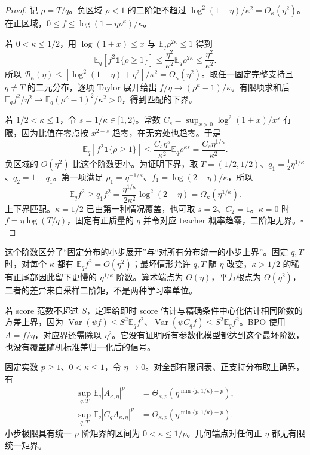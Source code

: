 \documentclass[lang=cn,scheme=chinese,openany]{../book/elegantbook}
\newcommand{\E}{\mathbb E}
\newcommand{\Var}{\operatorname{Var}}
\begin{document}
\begin{proof}
记 $\rho=T/q$。负区域 $\rho<1$ 的二阶矩不超过 $\log^2(1-\eta)/\kappa^2=O_\kappa(\eta^2)$。在正区域，$0\le f\le\log(1+\eta\rho^\kappa)/\kappa$。

若 $0<\kappa\le1/2$，用 $\log(1+x)\le x$ 与 $\E_q\rho^{2\kappa}\le1$ 得到
\begin{equation}
 \E_q[f^2\mathbf1\{\rho\ge1\}]
 \le\frac{\eta^2}{\kappa^2}\E_q\rho^{2\kappa}
 \le\frac{\eta^2}{\kappa^2}.
\end{equation}
所以 $\mathcal B_\kappa(\eta)\le[\log^2(1-\eta)+\eta^2]/\kappa^2=O_\kappa(\eta^2)$。取任一固定完整支持且 $q\ne T$ 的二元分布，逐项 Taylor 展开给出 $f/\eta\to(\rho^\kappa-1)/\kappa$。有限项求和后 $\E_qf^2/\eta^2\to\E_q(\rho^\kappa-1)^2/\kappa^2>0$，得到匹配的下界。

若 $1/2<\kappa\le1$，令 $s=1/\kappa\in[1,2)$。常数 $C_s=\sup_{x>0}\log^2(1+x)/x^s$ 有限，因为比值在零点按 $x^{2-s}$ 趋零，在无穷处也趋零。于是
\begin{equation}
 \E_q[f^2\mathbf1\{\rho\ge1\}]
 \le\frac{C_s\eta^s}{\kappa^2}\E_q\rho^{\kappa s}
 =\frac{C_s\eta^{1/\kappa}}{\kappa^2}.
\end{equation}
负区域的 $O(\eta^2)$ 比这个阶数更小。为证明下界，取 $T=(1/2,1/2)$、$q_1=\tfrac12\eta^{1/\kappa}$、$q_2=1-q_1$。第一项满足 $\rho_1=\eta^{-1/\kappa}$、$f_1=\log(2-\eta)/\kappa$，所以
\begin{equation}
 \E_qf^2\ge q_1f_1^2
 =\frac{\eta^{1/\kappa}}{2\kappa^2}\log^2(2-\eta)
 =\Omega_\kappa(\eta^{1/\kappa}).
\end{equation}
上下界匹配。$\kappa=1/2$ 已由第一种情况覆盖，也可取 $s=2$、$C_2=1$。$\kappa=0$ 时 $f=\eta\log(T/q)$，固定有正质量的 $q$ 并令对应 teacher 概率趋零，二阶矩无界。\hfill$\square$
\end{proof}

这个阶数区分了“固定分布的小步展开”与“对所有分布统一的小步上界”。固定 $q,T$ 时，对每个 $\kappa$ 都有 $\E_qf^2=O(\eta^2)$；最坏情形允许 $q,T$ 随 $\eta$ 改变，$\kappa>1/2$ 的稀有正尾部因此留下更慢的 $\eta^{1/\kappa}$ 阶数。算术端点为 $\Theta(\eta)$，平方根点为 $\Theta(\eta^2)$，二者的差异来自采样二阶矩，不是两种学习率单位。

若 score 范数不超过 $S$，定理给即时 score 估计与精确条件中心化估计相同阶数的方差上界，因为 $\Var(\psi f)\le S^2\E_qf^2$、$\Var(\psi C_qf)\le S^2\E_qf^2$。BPO 使用 $A=f/\eta$，对应界还需除以 $\eta^2$。它没有证明所有参数化模型都达到这个最坏阶数，也没有覆盖随机标准差归一化后的信号。

\begin{theorem}[监督高阶矩的形状阈值]
\label{thm:power-general-moment-threshold}
固定实数 $p\ge1$、$0<\kappa\le1$，令 $\eta\to0$。对全部有限词表、正支持分布取上确界，有
\begin{align}
 \sup_{q,T}\E_q|A_{\kappa,\eta}|^p
 &=\Theta_{\kappa,p}\!\left(\eta^{\min\{p,1/\kappa\}-p}\right),\\
 \sup_{q,T}\E_q|C_qA_{\kappa,\eta}|^p
 &=\Theta_{\kappa,p}\!\left(\eta^{\min\{p,1/\kappa\}-p}\right).
\end{align}
小步极限具有统一 $p$ 阶矩界的区间为 $0<\kappa\le1/p$。几何端点对任何正 $\eta$ 都无有限统一矩界。
\end{theorem}
\end{document}
